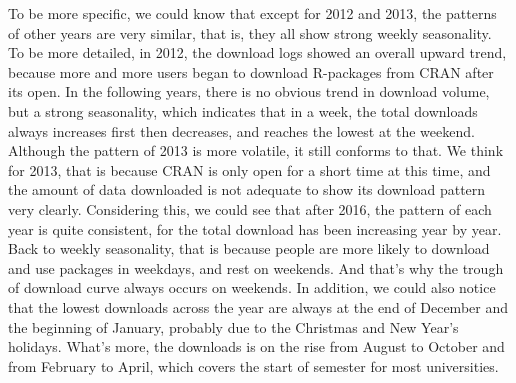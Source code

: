 \documentclass[
]{book}
\begin{document}
To be more specific, we could know that except for 2012 and 2013, the patterns of other years are very similar, that is, they all show strong weekly seasonality. To be more detailed, in 2012, the download logs showed an overall upward trend, because more and more users began to download R-packages from CRAN after its open. In the following years, there is no obvious trend in download volume, but a strong seasonality, which indicates that in a week, the total downloads always increases first then decreases, and reaches the lowest at the weekend. Although the pattern of 2013 is more volatile, it still conforms to that. We think for 2013, that is because CRAN is only open for a short time at this time, and the amount of data downloaded is not adequate to show its download pattern very clearly. Considering this, we could see that after 2016, the pattern of each year is quite consistent, for the total download has been increasing year by year. Back to weekly seasonality, that is because people are more likely to download and use packages in weekdays, and rest on weekends. And that's why the trough of download curve always occurs on weekends. In addition, we could also notice that the lowest downloads across the year are always at the end of December and the beginning of January, probably due to the Christmas and New Year's holidays. What's more, the downloads is on the rise from August to October and from February to April, which covers the start of semester for most universities.
\end{document}

